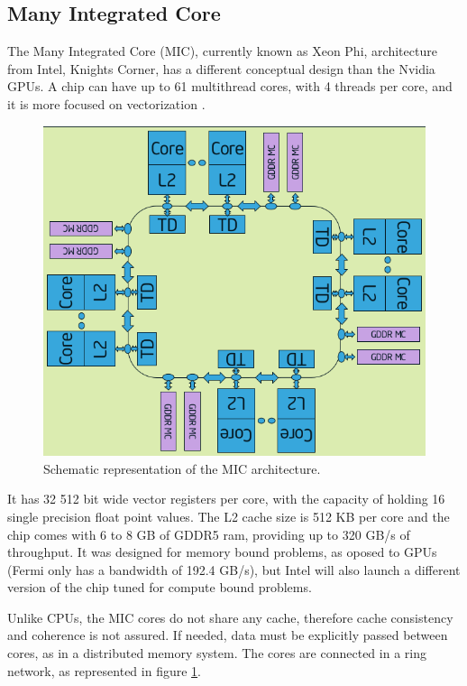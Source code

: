 \subsection{\intel Many Integrated Core}

The \intel Many Integrated Core (MIC), currently known as \intel Xeon Phi, architecture from Intel, Knights Corner, has a different conceptual design than the Nvidia GPUs. A chip can have up to 61 multithread cores, with 4 threads per core, and it is more focused on vectorization \cite{Intel:MIC:Elgar}. 

\begin{figure}[!htp]
	\begin{center}
		\includegraphics[scale=0.5]{../../common/img/mic_arch.png}
		\caption{Schematic representation of the \intel MIC architecture.}
		\label{fig:mic}
	\end{center}
\end{figure}

It has 32 512 bit wide vector registers per core, with the capacity of holding 16 single precision float point values. The L2 cache size is 512 KB per core and the chip comes with 6 to 8 GB of GDDR5 ram, providing up to 320 GB/s of throughput. It was designed for memory bound problems, as oposed to GPUs (Fermi only has a bandwidth of 192.4 GB/s), but Intel will also launch a different version of the chip tuned for compute bound problems.

Unlike CPUs, the MIC cores do not share any cache, therefore cache consistency and coherence is not assured. If needed, data must be explicitly passed between cores, as in a distributed memory system. The cores are connected in a ring network, as represented in figure \ref{fig:mic}.

